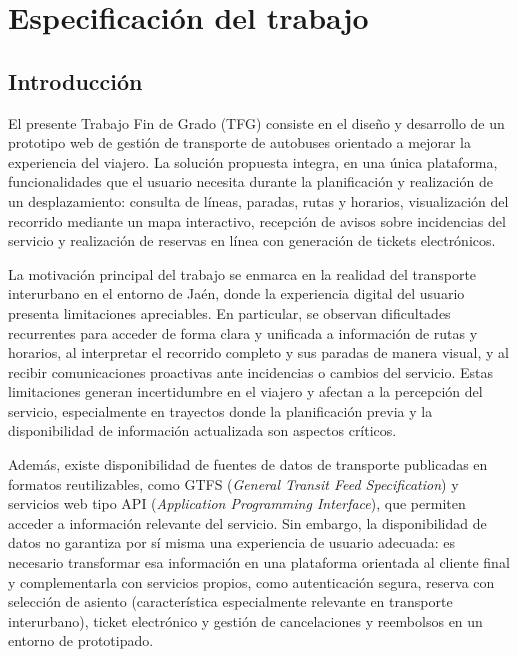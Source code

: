 \chapter{Especificación del trabajo}
\label{cap:especificacion}

\section{Introducción}
\label{sec:cap1-introduccion}

El presente Trabajo Fin de Grado (TFG) consiste en el diseño y desarrollo de un prototipo web de gestión de transporte de autobuses orientado a mejorar la experiencia del viajero. La solución propuesta integra, en una única plataforma, funcionalidades que el usuario necesita durante la planificación y realización de un desplazamiento: consulta de líneas, paradas, rutas y horarios, visualización del recorrido mediante un mapa interactivo, recepción de avisos sobre incidencias del servicio y realización de reservas en línea con generación de tickets electrónicos.

La motivación principal del trabajo se enmarca en la realidad del transporte interurbano en el entorno de Jaén, donde la experiencia digital del usuario presenta limitaciones apreciables. En particular, se observan dificultades recurrentes para acceder de forma clara y unificada a información de rutas y horarios, al interpretar el recorrido completo y sus paradas de manera visual, y al recibir comunicaciones proactivas ante incidencias o cambios del servicio. Estas limitaciones generan incertidumbre en el viajero y afectan a la percepción del servicio, especialmente en trayectos donde la planificación previa y la disponibilidad de información actualizada son aspectos críticos.

Además, existe disponibilidad de fuentes de datos de transporte publicadas en formatos reutilizables, como GTFS (\textit{General Transit Feed Specification}) y servicios web tipo API (\textit{Application Programming Interface}), que permiten acceder a información relevante del servicio. Sin embargo, la disponibilidad de datos no garantiza por sí misma una experiencia de usuario adecuada: es necesario transformar esa información en una plataforma orientada al cliente final y complementarla con servicios propios, como autenticación segura, reserva con selección de asiento (característica especialmente relevante en transporte interurbano), ticket electrónico y gestión de cancelaciones y reembolsos en un entorno de prototipado.


